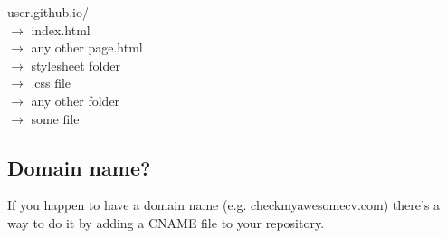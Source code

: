 \documentclass[a4paper,11pt]{article}
\begin{document}
\begin{spacing}{1.1}
user.github.io/ \\
     \qquad  $\rightarrow$ index.html \\
     \qquad  $\rightarrow$ any other page.html \\
     \qquad  $\rightarrow$ stylesheet folder \\
     \quad \quad \qquad $\rightarrow$ .css file \\
     \qquad  $\rightarrow$ any other folder \\
     \quad \quad \qquad $\rightarrow$ some file \\
\end{spacing}

\subsection{Domain name?}
If you happen to have a domain name (e.g. checkmyawesomecv.com) there's a way to do it by adding a CNAME file to your repository.

\end{document}
